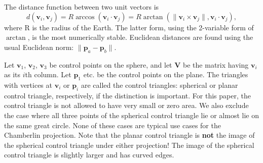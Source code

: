 \documentclass[]{interact}
\begin{document}
The distance function between two unit vectors is
\begin{equation}
d\left(\mathbf v_i, \mathbf v_j\right)
= R \arccos\left(\mathbf v_i \cdot \mathbf v_j\right)
= R \arctan\left(\|\mathbf v_i \times \mathbf v_j\|,
\mathbf v_i \cdot \mathbf v_j\right),
\end{equation}
where R is the radius of the Earth. The latter form, using the 2-variable form
of $\arctan$, is the most numerically stable. Euclidean distances are found
using the usual Euclidean norm: $\|\mathbf p_a - \mathbf p_b\|$.

Let $\mathbf v_1$, $\mathbf v_2$, $\mathbf v_3$ be control points on the sphere,
and let $\mathbf V$ be the matrix having $\mathbf v_i$ as its $i$th column.
Let $\mathbf p_1$ etc. be the control points on the plane. The
triangles with vertices at $\mathbf v_i$ or $\mathbf p_i$ are called the
control triangles: spherical or planar control triangle, respectively, if the
distinction is important. For this paper, the control triangle is not allowed
to have very small or zero area. We also exclude the case where all three
points of the spherical control triangle lie or almost lie on the same great
circle. None of these cases are typical use cases for the Chamberlin
projection. Note that the planar control triangle is \textbf{not} the
image of the spherical control triangle under either projection! The image
of the spherical control triangle is slightly larger and has curved edges.
\end{document}
